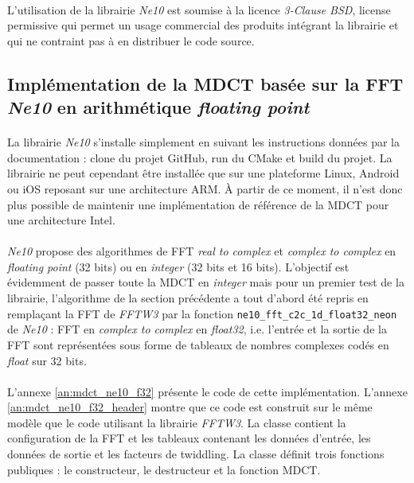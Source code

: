 \documentclass{article}
\begin{document}
    \paragraph{}
    L'utilisation de la librairie \emph{Ne10} est soumise à la licence \emph{3-Clause BSD}, license permissive qui permet un usage commercial des produits intégrant la librairie et qui ne contraint pas à en distribuer le code source\cite{BSD}.

    \subsection{Implémentation de la MDCT basée sur la FFT \emph{Ne10} en arithmétique \emph{floating point}}
    \paragraph{}
    La librairie \emph{Ne10} s'installe simplement en suivant les instructions données par la documentation : clone du projet GitHub, run du CMake et build du projet\cite{Ne10}. La librairie ne peut cependant être installée que sur une plateforme Linux, Android ou iOS reposant sur une architecture ARM. À partir de ce moment, il n'est donc plus possible de maintenir une implémentation de référence de la MDCT pour une architecture Intel.

    \paragraph{}
    \emph{Ne10} propose des algorithmes de FFT \emph{real to complex} et \emph{complex to complex} en \emph{floating point} (32 bits) ou en \emph{integer} (32 bits et 16 bits). L'objectif est évidemment de passer toute la MDCT en \emph{integer} mais pour un premier test de la librairie, l'algorithme de la section précédente a tout d'abord été repris en remplaçant la FFT de \emph{FFTW3} par la fonction \texttt{ne10\_fft\_c2c\_1d\_float32\_neon} de \emph{Ne10} : FFT en \emph{complex to complex} en \emph{float32}, i.e. l'entrée et la sortie de la FFT sont représentées sous forme de tableaux de nombres complexes codés en \emph{float} sur 32 bits.

    \paragraph{}
    L'annexe \ref{an:mdct_ne10_f32} présente le code de cette implémentation. L'annexe \ref{an:mdct_ne10_f32_header} montre que ce code est construit sur le même modèle que le code utilisant la librairie \emph{FFTW3}. La classe contient la configuration de la FFT et les tableaux contenant les données d'entrée, les données de sortie et les facteurs de twiddling. La classe définit trois fonctions publiques : le constructeur, le destructeur et la fonction MDCT.
\end{document}
